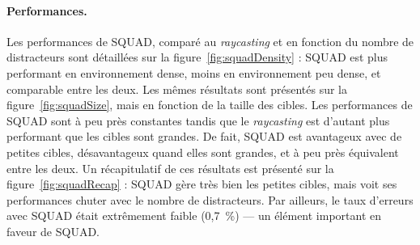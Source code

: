 	\paragraph{Performances.}
	Les performances de SQUAD, comparé au \emph{raycasting} et en fonction du nombre de distracteurs sont détaillées sur la figure~\ref{fig:squadDensity} : SQUAD est plus performant en environnement dense, moins en environnement peu dense, et comparable entre les deux. Les mêmes résultats sont présentés sur la figure~\ref{fig:squadSize}, mais en fonction de la taille des cibles. Les performances de SQUAD sont à peu près constantes tandis que le \emph{raycasting} est d'autant plus performant que les cibles sont grandes. De fait, SQUAD est avantageux avec de petites cibles, désavantageux quand elles sont grandes, et à peu près équivalent entre les deux. Un récapitulatif de ces résultats est présenté sur la figure~\ref{fig:squadRecap} : SQUAD gère très bien les petites cibles, mais voit ses performances chuter avec le nombre de distracteurs. Par ailleurs, le taux d'erreurs avec SQUAD était extrêmement faible (0,7~\%{}) --- un élément important en faveur de SQUAD.
	
